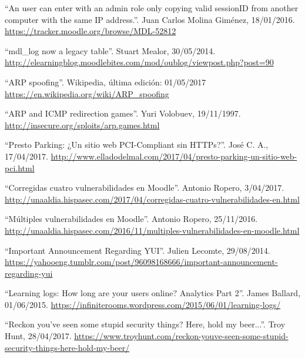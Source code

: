  ``An user can enter with an admin role only copying valid sessionID from another computer with the same IP address.''. Juan Carlos Molina Giménez, 18/01/2016. \url{https://tracker.moodle.org/browse/MDL-52812}

 ``mdl\_log now a legacy table''. Stuart Mealor, 30/05/2014. \url{http://elearningblog.moodlebites.com/mod/oublog/viewpost.php?post=90}

 ``ARP spoofing''. Wikipedia, última edición: 01/05/2017 \url{https://en.wikipedia.org/wiki/ARP_spoofing}

 ``ARP and ICMP redirection games''. Yuri Volobuev, 19/11/1997. \url{http://insecure.org/sploits/arp.games.html}

 ``Presto Parking: ¿Un sitio web PCI-Compliant sin HTTPs?''. José C. A., 17/04/2017. \url{http://www.elladodelmal.com/2017/04/presto-parking-un-sitio-web-pci.html}

 ``Corregidas cuatro vulnerabilidades en Moodle''. Antonio Ropero, 3/04/2017. \url{http://unaaldia.hispasec.com/2017/04/corregidas-cuatro-vulnerabilidades-en.html}

 ``Múltiples vulnerabilidades en Moodle''. Antonio Ropero, 25/11/2016. \url{http://unaaldia.hispasec.com/2016/11/multiples-vulnerabilidades-en-moodle.html}

 ``Important Announcement Regarding YUI''. Julien Lecomte, 29/08/2014. \url{https://yahooeng.tumblr.com/post/96098168666/important-announcement-regarding-yui}

 ``Learning logs: How long are your users online? Analytics Part 2''. James Ballard, 01/06/2015. \url{https://infiniterooms.wordpress.com/2015/06/01/learning-logs/}

 ``Reckon you've seen some stupid security things? Here, hold my beer...''. Troy Hunt, 28/04/2017. \url{https://www.troyhunt.com/reckon-youve-seen-some-stupid-security-things-here-hold-my-beer/}

\bigskip
